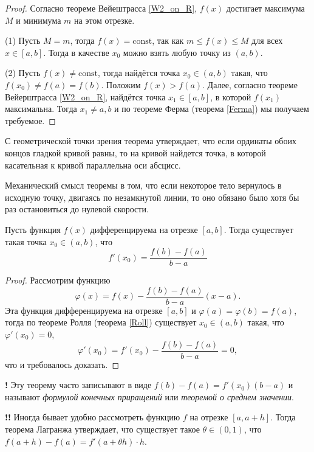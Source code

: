 \begin{proof}
    Согласно теореме Вейештрасса \ref{W2_on_R}, $f(x)$ достигает максимума $M$ и минимума $m$ на этом отрезке.

    (1) Пусть $M = m$, тогда $f(x) = \mathrm{const}$, так как $m \le f(x) \le M$ для всех $x \in [a,b]$. Тогда в качестве $x_0$ можно взять любую точку из $(a,b)$.

    (2) Пусть $f(x) \ne \mathrm{const}$, тогда найдётся точка $x_0 \in (a,b)$ такая, что $f(x_0) \ne f(a) =f(b)$. Положим $f(x) > f(a)$. Далее, согласно теореме Вейерштрасса \ref{W2_on_R}, найдётся точка $x_1 \in [a,b]$, в которой $f(x_1)$ максимальна. Тогда $x_1 \ne a,b$ и по теореме Ферма (теорема \ref{Ferma}) мы получаем требуемое. 
\end{proof}


С геометрической точки зрения теорема утверждает, что если ординаты обоих концов гладкой кривой равны, то на кривой найдется точка, в которой касательная к кривой параллельна оси абсцисс.

Механический смысл теоремы в том, что если некоторое тело вернулось в исходную точку, двигаясь по незамкнутой линии, то оно обязано было хотя бы раз остановиться до нулевой скорости.

\begin{theorem}[Лагранж]\label{Langrange}
    Пусть функция $f(x)$ дифференцируема на отрезке $[a,b]$. Тогда существует такая точка $x_0 \in (a,b)$, что 
    \[
     f'(x_0) = \frac{f(b) - f(a)}{b-a}
    \]
\end{theorem}

\begin{proof}
    Рассмотрим функцию
    \[
     \varphi(x)  = f(x) - \frac{f(b) - f(a)}{b-a}(x-a).
    \]
Эта функция дифференцируема на отрезке $[a,b]$ и $\varphi(a) = \varphi(b) =  f(a)$, тогда по теореме Ролля (теорема \ref{Roll}) существует $x_0 \in (a,b)$ такая, что $\varphi'(x_0) = 0$, \ie
\[
 \varphi'(x_0) = f'(x_0) - \frac{f(b) - f(a)}{b-a} = 0,
\]
что и требовалось доказать.
\end{proof}

\begin{mydanger}{\bf{!}}
    Эту теорему часто записывают в виде $f(b) - f(a)=  f'(x_0)(b-a)$ и называют \textit{формулой конечных приращений} или \textit{теоремой о среднем значении}.
\end{mydanger}

\begin{mydanger}{\bf{!!}}
    Иногда бывает удобно рассмотреть функцию $f$ на отрезке $[a, a+h]$. Тогда теорема Лагранжа утверждает, что существует такое $\theta \in (0,1)$, что $f(a+h) - f(a) = f'(a+\theta h)\cdot h.$
\end{mydanger}

